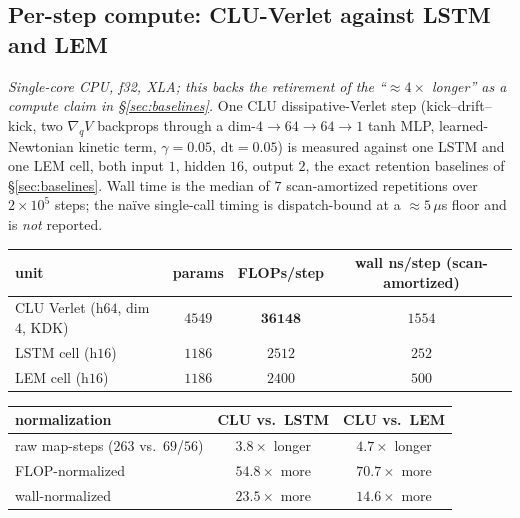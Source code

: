 \documentclass{article}
\begin{document}
\subsection{Per-step compute: CLU-Verlet against LSTM and LEM}\label{app:compute}

\emph{Single-core CPU, f32, XLA; this backs the retirement of the ``$\approx4\times$ longer'' as a compute claim in \S\ref{sec:baselines}.} One CLU dissipative-Verlet step (kick--drift--kick, two $\nabla_qV$ backprops through a dim-$4{\to}64{\to}64{\to}1$ tanh MLP, learned-Newtonian kinetic term, $\gamma{=}0.05$, $\mathrm{dt}{=}0.05$) is measured against one LSTM and one LEM cell, both input $1$, hidden $16$, output $2$, the exact retention baselines of \S\ref{sec:baselines}. Wall time is the median of $7$ scan-amortized repetitions over $2{\times}10^5$ steps; the na\"ive single-call timing is dispatch-bound at a $\approx5\,\mu$s floor and is \emph{not} reported.

\begin{center}\footnotesize
\begin{tabular}{lccc}
\toprule
unit & params & FLOPs/step & wall ns/step (scan-amortized) \\
\midrule
CLU Verlet (h$64$, dim $4$, KDK) & $4549$ & $\mathbf{36148}$ & $1554$ \\
LSTM cell (h$16$) & $1186$ & $2512$ & $252$ \\
LEM cell (h$16$) & $1186$ & $2400$ & $500$ \\
\bottomrule
\end{tabular}
\end{center}

\begin{center}\footnotesize
\begin{tabular}{lcc}
\toprule
normalization & CLU vs.\ LSTM & CLU vs.\ LEM \\
\midrule
raw map-steps ($263$ vs.\ $69$/$56$) & $3.8\times$ longer & $4.7\times$ longer \\
FLOP-normalized & $\mathbf{54.8\times}$ more & $\mathbf{70.7\times}$ more \\
wall-normalized & $\mathbf{23.5\times}$ more & $\mathbf{14.6\times}$ more \\
\bottomrule
\end{tabular}
\end{center}
\end{document}
